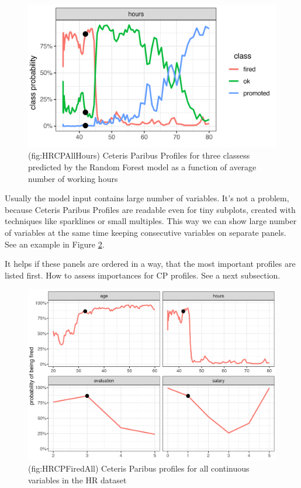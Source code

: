 \documentclass[]{krantz}
\theoremstyle{definition}
\theoremstyle{definition}
\theoremstyle{definition}
\theoremstyle{remark}
\begin{document}
\begin{figure}

{\centering \includegraphics[width=0.6\linewidth]{figure/HR_cp_all_hours} 

}

\caption{(fig:HRCPAllHours) Ceteris Paribus Profiles for three classess predicted by the Random Forest model as a function of average number of working hours}\label{fig:HRCPAllHours}
\end{figure}

Usually the model input contains large number of variables. It's not a
problem, because Ceteris Paribus Profiles are readable even for tiny
subplots, created with techniques like sparklines or small multiples.
This way we can show large number of variables at the same time keeping
consecutive variables on separate panels. See an example in Figure
\ref{fig:HRCPFiredAll}.

It helps if these panels are ordered in a way, that the most important
profiles are listed first. How to assess importances for CP profiles.
See a next subsection.

\begin{figure}

{\centering \includegraphics[width=0.7\linewidth]{figure/HR_cp_fired_all} 

}

\caption{(fig:HRCPFiredAll) Ceteris Paribus profiles for all continuous variables in the HR dataset}\label{fig:HRCPFiredAll}
\end{figure}
\end{document}
